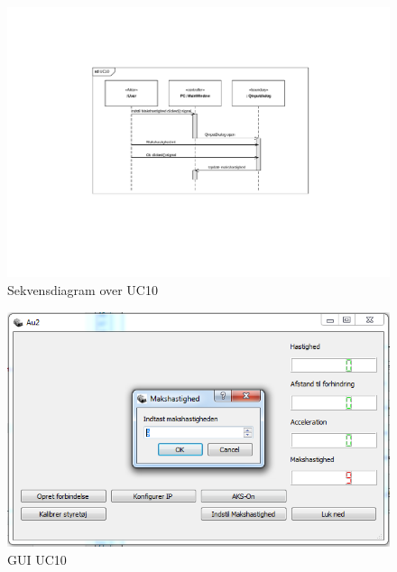 \begin{figure}[H]
\centering
\includegraphics[width=\textwidth* 2/3,height=\textwidth* 4/10 ]{../fig/diagrammer/pc/sd_uc10.pdf}
\caption{Sekvensdiagram over UC10}
\label{fig:cd_uc10}
\end{figure}

\begin{figure}[H]
\centering
\includegraphics[width=\textwidth* 3/4,height=\textwidth* 9/20 ]{../fig/billeder/gui_uc10.png}
\caption{GUI UC10}
\label{fig:GUI_uc10}
\end{figure}


